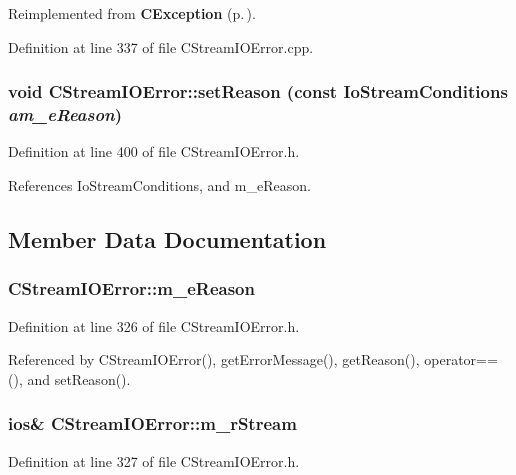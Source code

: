 Reimplemented from {\bf CException} {\rm (p.\,\pageref{classCException_a8})}.

Definition at line 337 of file CStream\-IOError.cpp.
\subsubsection{\setlength{\rightskip}{0pt plus 5cm}void CStream\-IOError::set\-Reason (const {\bf Io\-Stream\-Conditions} {\em am\_\-e\-Reason})\hspace{0.3cm}{\tt  [inline, protected]}}\label{classCStreamIOError_b0}




Definition at line 400 of file CStream\-IOError.h.

References Io\-Stream\-Conditions, and m\_\-e\-Reason.

\subsection{Member Data Documentation}
\subsubsection{ CStream\-IOError::m\_\-e\-Reason\hspace{0.3cm}{\tt  [private]}}\label{classCStreamIOError_o0}




Definition at line 326 of file CStream\-IOError.h.

Referenced by CStream\-IOError(), get\-Error\-Message(), get\-Reason(), operator==(), and set\-Reason().
\subsubsection{\setlength{\rightskip}{0pt plus 5cm}ios\& CStream\-IOError::m\_\-r\-Stream\hspace{0.3cm}{\tt  [private]}}\label{classCStreamIOError_o1}




Definition at line 327 of file CStream\-IOError.h.

